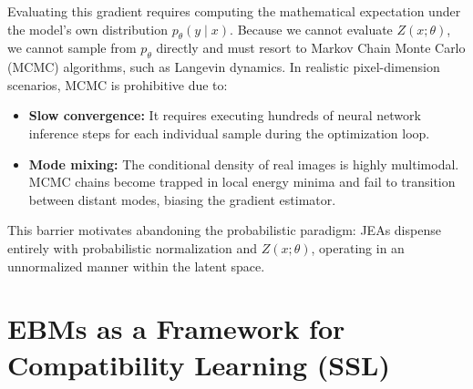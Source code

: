 \documentclass[11pt, oneside, openany]{book}
\begin{document}
Evaluating this gradient requires computing the mathematical expectation under the model's own distribution $p_{\theta}(y \mid x)$. Because we cannot evaluate $Z(x;\theta)$, we cannot sample from $p_{\theta}$ directly and must resort to Markov Chain Monte Carlo (MCMC) algorithms, such as Langevin dynamics. In realistic pixel-dimension scenarios, MCMC is prohibitive due to:
\begin{itemize}
    \item \textbf{Slow convergence:} It requires executing hundreds of neural network inference steps for each individual sample during the optimization loop.
    \item \textbf{Mode mixing:} The conditional density of real images is highly multimodal. MCMC chains become trapped in local energy minima and fail to transition between distant modes, biasing the gradient estimator.
\end{itemize}

This barrier motivates abandoning the probabilistic paradigm: JEAs dispense entirely with probabilistic normalization and $Z(x;\theta)$, operating in an unnormalized manner within the latent space.

\section{EBMs as a Framework for Compatibility Learning (SSL)}
\label{sec:2.5}
\end{document}
